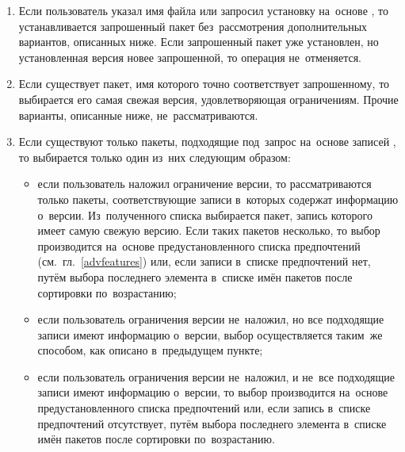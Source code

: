 \begin{enumerate}

\item {
Если пользователь указал имя файла или запросил установку на~основе ,
то устанавливается запрошенный пакет без~рассмотрения дополнительных вариантов, описанных ниже.
Если запрошенный пакет уже установлен, но установленная версия новее запрошенной,
то операция не~отменяется.
}

\item {
Если существует пакет, имя которого точно соответствует запрошенному, то выбирается его самая свежая версия, удовлетворяющая ограничениям. 
Прочие варианты, описанные ниже, не~рассматриваются.
}

\item {
Если существуют только пакеты, подходящие под~запрос на~основе записей ,
то выбирается только один из~них следующим образом:
}

\begin{itemize}

\item {
если пользователь наложил ограничение версии, то рассматриваются только пакеты,
соответствующие записи  в~которых содержат информацию о~версии.
Из~полученного списка выбирается пакет, запись  которого имеет самую свежую версию.
Если таких пакетов несколько, то выбор производится на~основе предустановленного списка предпочтений (см.~гл.~\ref{advfeatures})
или, если записи в~списке предпочтений нет, 
путём выбора последнего элемента в~списке имён пакетов после сортировки по~возрастанию;
}

\item {
если пользователь ограничения версии не~наложил, но все подходящие записи  имеют информацию о~версии,
выбор осуществляется таким~же способом, как описано в~предыдущем пункте;
}

\item {
если пользователь ограничения версии не~наложил, и не~все подходящие записи  имеют информацию о~версии,
то выбор производится на~основе предустановленного списка предпочтений или, 
если запись в~списке предпочтений отсутствует, путём выбора последнего элемента в~списке имён пакетов после сортировки по~возрастанию.
}

\end{itemize}
\end{enumerate}

